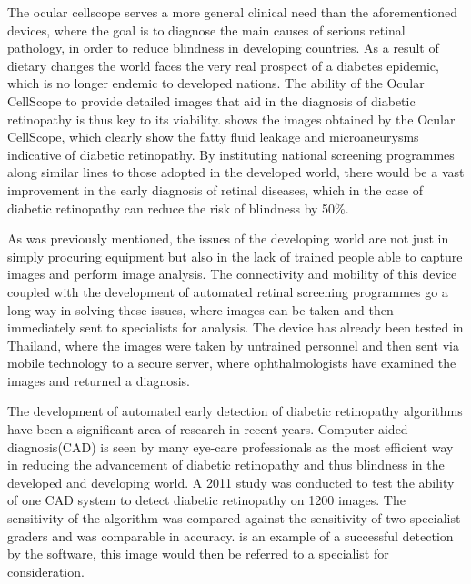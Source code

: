 The ocular cellscope serves a more general clinical need than the aforementioned
devices, where the goal is to diagnose the main causes of serious retinal pathology,
in order to reduce blindness in developing countries. As a result of dietary changes
the world faces the very real prospect of a diabetes epidemic, which is no longer
endemic to developed nations. \cite{burgess2013diabetic} The ability of the Ocular
CellScope to provide detailed images that aid in the diagnosis of diabetic retinopathy
is thus key to its viability.  shows the images obtained by the Ocular
CellScope, which clearly show the fatty fluid leakage and microaneurysms indicative of
diabetic retinopathy. By instituting national screening programmes along similar lines
to those adopted in the developed world, there would be a vast improvement in the early
diagnosis of retinal diseases, which in the case of diabetic retinopathy can reduce the
risk of blindness by 50\%. \cite{abramoff2010automated} 


As was previously mentioned, the issues of the developing world are not just in simply
procuring equipment but also in the lack of trained people able to capture images and
perform image analysis. The connectivity and mobility of this device coupled with the
development of automated retinal screening programmes go a long way in solving these issues,
where images can be taken and then immediately sent to specialists for analysis. The
device has already been tested in Thailand, where the images were taken by untrained
personnel and then sent via mobile technology to a secure server, where ophthalmologists
have examined the images and returned a diagnosis.  

The development of automated early detection of diabetic retinopathy algorithms have
been a significant area of research in recent years. Computer aided diagnosis(CAD)
is seen by many eye-care professionals as the most efficient way in reducing the
advancement of diabetic retinopathy and thus blindness in the developed and developing
world. A 2011 study was conducted to test the ability of one CAD system to detect
diabetic retinopathy on 1200 images. The sensitivity of the algorithm was compared
against the sensitivity of two specialist graders and was comparable in accuracy.
\cite{sanchez2011evaluation}  is an example of a successful detection
by the software, this image would then be referred to a specialist for consideration.

